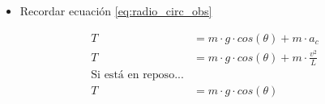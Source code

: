     \begin{itemize}
        \item Recordar ecuación \ref{eq:radio_circ_obs}
    \end{itemize}
    \begin{equation}
    \begin{split}
        T &= m \cdot g \cdot cos(\theta) + m \cdot a_c\\
        T &= m \cdot g \cdot cos(\theta) + m \cdot \frac{v^2}{L}\\
        \text{Si está en reposo...}\\
        T &= m \cdot g \cdot cos(\theta)\\
    \end{split}
    \end{equation}
    